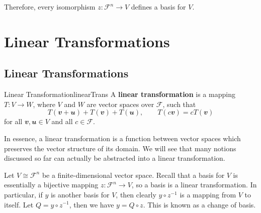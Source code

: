 \documentclass[math, code]{amznotes}
\theoremstyle{remark}
\begin{document}
Therefore, every isomorphism $z \colon \mathcal{F}^n \to V$ defines a basis for $V$.
\chapter{Linear Transformations}
\section{Linear Transformations}
\begin{dfnbox}{Linear Transformation}{linearTrans}
    A {\color{red} \textbf{linear transformation}} is a mapping $T \colon V \to W$, where $V$ and $W$ are vector spaces over $\mathcal{F}$, such that
    \begin{equation*}
        T(\mathbfit{v + u}) + T(\mathbfit{v}) + T(\mathbfit{u}), \qquad T(c\mathbfit{v}) = cT(\mathbfit{v})
    \end{equation*}
    for all $\mathbfit{v}, \mathbfit{u} \in V$ and all $c \in \mathcal{F}$.
\end{dfnbox}
In essence, a linear transformation is a function between vector spaces which preserves the vector structure of its domain. We will see that many notions discussed so far can actually be abstracted into a linear transformation.

Let $V \cong \mathcal{F}^n$ be a finite-dimensional vector space. Recall that a basis for $V$ is essentially a bijective mapping $z \colon \mathcal{F}^n \to V$, so a basis is a linear transformation. In particular, if $y$ is another basis for $V$, then clearly $y \circ z^{-1}$ is a mapping from $V$ to itself. Let $Q = y \circ z^{-1}$, then we have $y = Q \circ z$. This is known as a change of basis.
\end{document}
